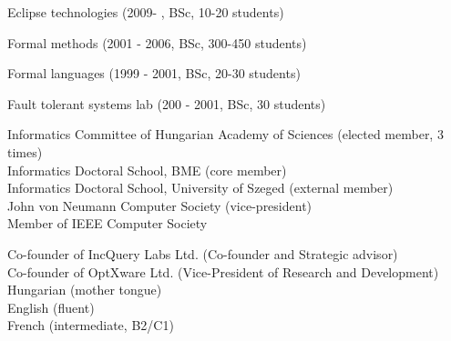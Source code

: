 \documentclass{xetexCV}
\begin{document}
Eclipse technologies (2009- , BSc, 10-20 students) 


Formal methods (2001 - 2006, BSc, 300-450 students)

 
Formal languages (1999 - 2001, BSc, 20-30 students)

Fault tolerant systems lab (200 - 2001, BSc, 30 students)

Informatics Committee of Hungarian Academy of Sciences (elected member, 3 times)   \\
Informatics Doctoral School, BME (core member)   \\
Informatics Doctoral School, University of Szeged (external member)   \\
John von Neumann Computer Society (vice-president)  \\
Member of IEEE Computer Society 

Co-founder of IncQuery Labs Ltd. (Co-founder and Strategic advisor)   \\
Co-founder of OptXware Ltd. (Vice-President of Research and Development)  \\

Hungarian (mother tongue) \\ 
English (fluent) \\ 
French (intermediate, B2/C1)



\begin{refsection}
\newrefcontext[labelprefix=CH]
\nocite{sle2016-chair,icmt2014-chair,fase2013-chair,amt2012-chair,agtive2011-chair,grabats2010-chair,gtvmt2006-chair,grabats2006-chair}
\printbibliography[title=Program Co-Chair]
\end{refsection}

\begin{refsection}
\newrefcontext[labelprefix=SC]
\nocite{etaps2008-sc,etaps2013-sc}
\printbibliography[title=Steering Committee Member]
\end{refsection}

\begin{refsection}
\newrefcontext[labelprefix=LO]
\nocite{icse2019post-chair,staf16ws-chair,staf2015ds-chair,staf2013-chair,models2012-chair,sensus2009-lo,etaps2008-lo,models2007-chair,edcc2005-lo}
\printbibliography[title=Chair of Organizing Committees]
\end{refsection}
\end{document}
